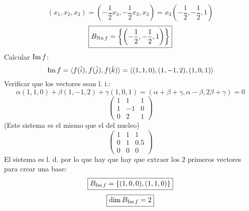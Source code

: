 \documentclass[../practica.root.tex]{subfiles}
\begin{document}
\begin{enumerate}
\begin{enumerate}
\[                    \] \[
                        (x_1, x_2, x_3) = \left( -\frac{1}{2}x_3, -\frac{1}{2}x_3, x_3 \right) = x_3\left(-\frac{1}{2}, -\frac{1}{2}, 1\right)
                    \] \[
                        \boxed{B_{\operatorname{Nu} f} = \left\{\left(-\frac{1}{2}, -\frac{1}{2}, 1\right)\right\}}
                    \]
                    Calcular \(\operatorname{Im} f\):
                    \[ \operatorname{Im} f = \langle f(\hat{i}), f(\hat{j}), f(\hat{k}) \rangle = \langle (1,1,0),(1,-1,2),(1,0,1) \rangle\]
                    Verificar que los vectores sean l. i.:
                    \[
                        \alpha(1,1,0) + \beta(1,-1,2) + \gamma(1,0,1) = (\alpha + \beta + \gamma, \alpha - \beta, 2\beta + \gamma) = 0
                    \] \[
                        \begin{pmatrix}
                            1 & 1  & 1 \\
                            1 & -1 & 0 \\
                            0 & 2  & 1
                        \end{pmatrix}
                    \]
                    (Este sistema es el mismo que el del nucleo)
                    \[
                        \begin{pmatrix}
                            1 & 1 & 1   \\
                            0 & 1 & 0.5 \\
                            0 & 0 & 0
                        \end{pmatrix}
                    \]
                    El sistema es l. d. por lo que hay que hay que extraer los 2 primeros vectores para crear una base:
                    \[ \boxed{B_{\operatorname{Im} f} = \{ (1,0,0),(1,1,0) \}} \]
                    \[ \boxed{\dim B_{\operatorname{Im} f} = 2} \]


\end{enumerate}
\end{enumerate}
\end{document}
